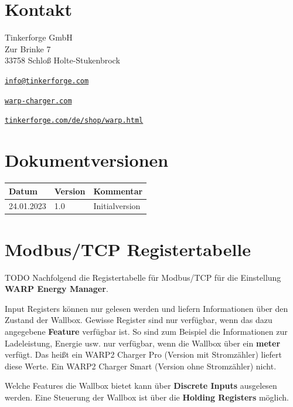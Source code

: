 \documentclass[a4paper,10pt]{article}
\begin{document}
\begin{multicols*}{2}
	\newpage

	\section{Kontakt}
	Tinkerforge GmbH\\ Zur Brinke 7\\ 33758 Schloß Holte-Stukenbrock
	\begin{description}[leftmargin=!,labelwidth=\widthof{\textbf{Website}}]
		\item[E-Mail] \href{mailto:info@tinkerforge.com}{\texttt{info@tinkerforge.com}}
		\item[Website] \href{https://warp-charger.com}{\texttt{warp-charger.com}}
		\item[Telefon] 
		\item[Shop] \href{https://tinkerforge.com/de/shop/warp.html}{\texttt{tinkerforge.com/de/shop/warp.html}}
	\end{description}

	\section{Dokumentversionen}
	\begin{tabular}{lll}
		\toprule
		Datum      & Version & Kommentar                       \\
		\midrule
		24.01.2023 & 1.0     & Initialversion                  \\
		\bottomrule
	\end{tabular}

	\vfill
	\null

	\columnbreak
\appendix

\section{Modbus/TCP Registertabelle}
\label{modbus_tcp_registertabelle}
TODO
Nachfolgend die Registertabelle für Modbus/TCP für die Einstellung \textbf{WARP
Energy Manager}.

Input Registers können nur gelesen werden und liefern Informationen über den
Zustand der Wallbox. Gewisse Register sind nur verfügbar, wenn das dazu
angegebene \textbf{Feature} verfügbar ist. So sind zum Beispiel die
Informationen zur Ladeleistung, Energie usw. nur verfügbar, wenn die Wallbox
über ein \textbf{meter} verfügt. Das heißt ein WARP2 Charger Pro (Version mit
Stromzähler) liefert diese Werte. Ein WARP2 Charger Smart (Version ohne
Stromzähler) nicht.

Welche Features die Wallbox bietet kann über \textbf{Discrete Inputs} ausgelesen
werden. Eine Steuerung der Wallbox ist über die \textbf{Holding Registers}
möglich.

\end{multicols*}
\end{document}
